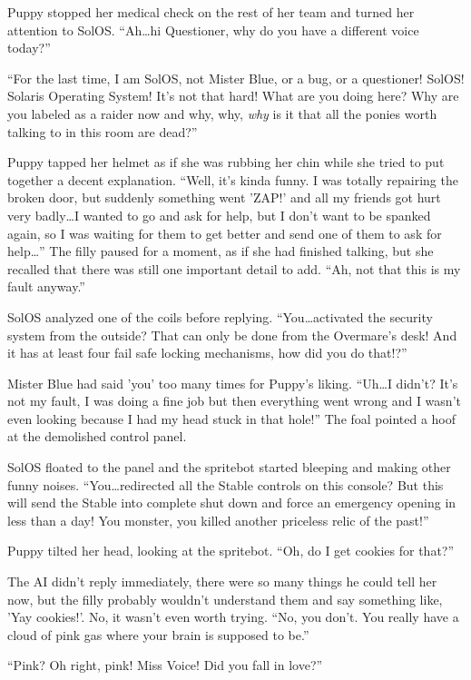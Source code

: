 Puppy stopped her medical check on the rest of her team and turned her attention to SolOS. ``Ah\dots hi Questioner, why do you have a different voice today?''

``For the last time, I am SolOS, not Mister Blue, or a bug, or a questioner! SolOS! Solaris Operating System! It's not that hard! What are you doing here? Why are you labeled as a raider now and why, why, \emph{why} is it that all the ponies worth talking to in this room are dead?''

Puppy tapped her helmet as if she was rubbing her chin while she tried to put together a decent explanation. ``Well, it's kinda funny. I was totally repairing the broken door, but suddenly something went 'ZAP!' and all my friends got hurt very badly\dots I wanted to go and ask for help, but I don't want to be spanked again, so I was waiting for them to get better and send one of them to ask for help\dots'' The filly paused for a moment, as if she had finished talking, but she recalled that there was still one important detail to add. ``Ah, not that this is my fault anyway.''

SolOS analyzed one of the coils before replying. ``You\dots activated the security system from the outside? That can only be done from the Overmare's desk! And it has at least four fail safe locking mechanisms, how did you do that!?''

Mister Blue had said 'you' too many times for Puppy's liking. ``Uh\dots I didn't? It's not my fault, I was doing a fine job but then everything went wrong and I wasn't even looking because I had my head stuck in that hole!'' The foal pointed a hoof at the demolished control panel.

SolOS floated to the panel and the spritebot started bleeping and making other funny noises. ``You\dots redirected all the Stable controls on this console? But this will send the Stable into complete shut down and force an emergency opening in less than a day! You monster, you killed another priceless relic of the past!''

Puppy tilted her head, looking at the spritebot. ``Oh, do I get cookies for that?''

The AI didn't reply immediately, there were so many things he could tell her now, but the filly probably wouldn't understand them and say something like, 'Yay cookies!'. No, it wasn't even worth trying. ``No, you don't. You really have a cloud of pink gas where your brain is supposed to be.''

``Pink? Oh right, pink! Miss Voice! Did you fall in love?''

